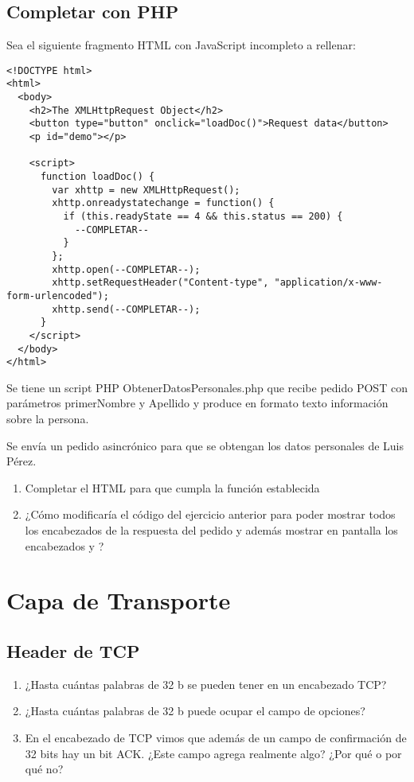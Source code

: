 \documentclass[12pt]{report}
\begin{document}
\begin{exer}
\section{Completar con PHP \stwo}
Sea el siguiente fragmento HTML con JavaScript incompleto a rellenar:

\begin{verbatim}
<!DOCTYPE html>
<html>
  <body>
    <h2>The XMLHttpRequest Object</h2>
    <button type="button" onclick="loadDoc()">Request data</button>
    <p id="demo"></p>
    
    <script>
      function loadDoc() {
        var xhttp = new XMLHttpRequest();
        xhttp.onreadystatechange = function() {
          if (this.readyState == 4 && this.status == 200) {
            --COMPLETAR--
          }
        };
        xhttp.open(--COMPLETAR--);
        xhttp.setRequestHeader("Content-type", "application/x-www-form-urlencoded");
        xhttp.send(--COMPLETAR--);
      }
    </script>
  </body>
</html>
\end{verbatim} 

Se tiene un script PHP ObtenerDatosPersonales.php que recibe pedido POST con parámetros
primerNombre y Apellido y produce en formato texto información sobre la persona.

Se envía un pedido asincrónico para que se obtengan los datos personales de Luis Pérez.

\begin{enumerate}
\item Completar el HTML para que cumpla la función establecida
\item ¿Cómo modificaría el código del ejercicio anterior para poder mostrar todos los
encabezados de la respuesta del pedido y además mostrar en pantalla los encabezados
 y ?
\end{enumerate}
\end{exer}

%
%

\chapter{Capa de Transporte}

\begin{exer}
\section{Header de TCP \sthree}
\begin{enumerate}
\item ¿Hasta cuántas palabras de 32 b se pueden tener en un encabezado TCP?
\item ¿Hasta cuántas palabras de 32 b puede ocupar el campo de opciones?
\item En el encabezado de TCP vimos que además de un campo de confirmación de 32 bits hay
un bit ACK. ¿Este campo agrega realmente algo? ¿Por qué o por qué no?
\end{enumerate}
\end{exer}
\end{document}
